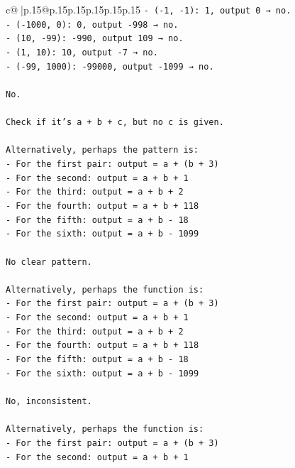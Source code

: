 \documentclass{article}
\begin{document}
{\begin{supertabular}{c@{$\;$}|p{.15\linewidth}@{}p{.15\linewidth}p{.15\linewidth}p{.15\linewidth}p{.15\linewidth}p{.15\linewidth}}
{{{\texttt{{-} ({-}1, {-}1): 1, output 0 → no.} \\
\texttt{{-} ({-}1000, 0): 0, output {-}998 → no.} \\
\texttt{{-} (10, {-}99): {-}990, output 109 → no.} \\
\texttt{{-} (1, 10): 10, output {-}7 → no.} \\
\texttt{{-} ({-}99, 1000): {-}99000, output {-}1099 → no.} \\
\\ 
\texttt{No.} \\
\\ 
\texttt{Check if it's a + b + c, but no c is given.} \\
\\ 
\texttt{Alternatively, perhaps the pattern is:} \\
\texttt{{-} For the first pair: output = a + (b + 3)} \\
\texttt{{-} For the second: output = a + b + 1} \\
\texttt{{-} For the third: output = a + b + 2} \\
\texttt{{-} For the fourth: output = a + b + 118} \\
\texttt{{-} For the fifth: output = a + b {-} 18} \\
\texttt{{-} For the sixth: output = a + b {-} 1099} \\
\\ 
\texttt{No clear pattern.} \\
\\ 
\texttt{Alternatively, perhaps the function is:} \\
\texttt{{-} For the first pair: output = a + (b + 3)} \\
\texttt{{-} For the second: output = a + b + 1} \\
\texttt{{-} For the third: output = a + b + 2} \\
\texttt{{-} For the fourth: output = a + b + 118} \\
\texttt{{-} For the fifth: output = a + b {-} 18} \\
\texttt{{-} For the sixth: output = a + b {-} 1099} \\
\\ 
\texttt{No, inconsistent.} \\
\\ 
\texttt{Alternatively, perhaps the function is:} \\
\texttt{{-} For the first pair: output = a + (b + 3)} \\
\texttt{{-} For the second: output = a + b + 1} \\
}}}
\end{supertabular}}
\end{document}
